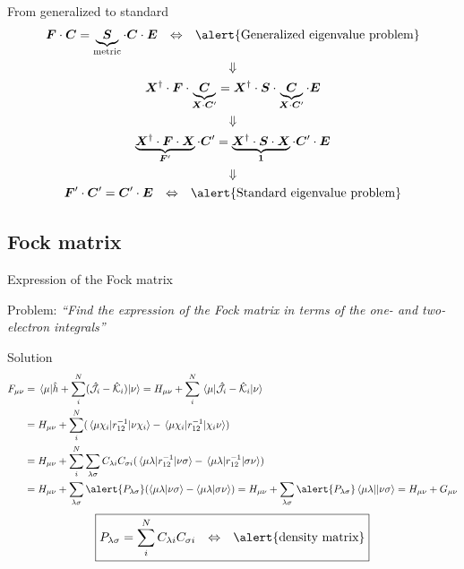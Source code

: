 \documentclass[aspectratio=169,9pt]{beamer}
\newcommand{\bC}{\boldsymbol{C}}
\newcommand{\bE}{\boldsymbol{E}}
\newcommand{\bI}{\boldsymbol{1}}
\newcommand{\bS}{\boldsymbol{S}}
\newcommand{\bF}{\boldsymbol{F}}
\newcommand{\bX}{\boldsymbol{X}}
\newcommand{\hh}{\hat{h}}
\newcommand{\chJ}{\Hat{\mathcal{J}}}
\newcommand{\chK}{\Hat{\mathcal{K}}}
\newcommand{\violet}[1]{\textcolor{hfViolet}{#1}}
\begin{document}
\begin{frame}{From generalized to standard}
	\begin{gather*}
		\bF \cdot \bC = \underbrace{\bS}_{\text{metric}} \cdot \bC \cdot \bE
		\qq{$\Leftrightarrow$}
		\text{\alert{Generalized eigenvalue problem}}
		\\
		\Downarrow
		\\
		\bX^\dag \cdot \bF \cdot \underbrace{\bC}_{\bX \cdot \bC'} = \bX^\dag \cdot \bS \cdot \underbrace{\bC}_{\bX \cdot \bC'} \cdot \bE
		\\
		\Downarrow
		\\
		\underbrace{\bX^\dag \cdot \bF \cdot \bX}_{\bF'} \cdot \bC' = \underbrace{\bX^\dag \cdot \bS \cdot \bX}_{\bI} \cdot \bC' \cdot \bE
		\\
		\Downarrow
		\\
		\bF' \cdot \bC' = \bC' \cdot \bE
		\qq{$\Leftrightarrow$}
		\text{\alert{Standard eigenvalue problem}}	
	\end{gather*}
\end{frame}


\subsection{Fock matrix}
\begin{frame}{Expression of the Fock matrix}
	\small
	\begin{block}{Problem:}
		\violet{\textit{``Find the expression of the Fock matrix in terms of the one- and two-electron integrals''}}
	\end{block}
	\pause
	\begin{block}{Solution}
	\begin{equation*}
		\begin{split}
			F_{\mu \nu} 
			& = \mel{\mu}{\hh + \sum_i^N (\chJ_i - \chK_i)}{\nu} = H_{\mu \nu} +  \sum_i^N \mel{\mu}{\chJ_i - \chK_i}{\nu}
			\\
			& = H_{\mu \nu} +  \sum_i^N (\mel{ \mu \chi_i }{ r_{12}^{-1}  }{ \nu \chi_i } - \mel{ \mu \chi_i }{  r_{12}^{-1} }{ \chi_i  \nu })
			\\
			& = H_{\mu \nu} +  \sum_i^N \sum_{\lambda \sigma} C_{\lambda i} C_{\sigma i} (\mel{ \mu \lambda }{ r_{12}^{-1}  }{ \nu \sigma } - \mel{ \mu \lambda }{  r_{12}^{-1} }{ \sigma  \nu })
			\\
			& = H_{\mu \nu} +  \sum_{\lambda \sigma} \alert{P_{\lambda \sigma}} (\braket{ \mu \lambda   }{ \nu \sigma } - \braket{ \mu \lambda  }{ \sigma  \nu })
			= H_{\mu \nu} +  \sum_{\lambda \sigma} \alert{P_{\lambda \sigma}} \mel{ \mu \lambda   }{}{ \nu \sigma }
			= H_{\mu \nu} +  G_{\mu \nu}
		\end{split}
	\end{equation*}
	\begin{equation*}
		\boxed{P_{\lambda \sigma} = \sum_i^N C_{\lambda i} C_{\sigma i}
		\qq{$\Leftrightarrow$}
		\text{\alert{density matrix}}}
	\end{equation*}
	\end{block}
\end{frame}
\end{document}
